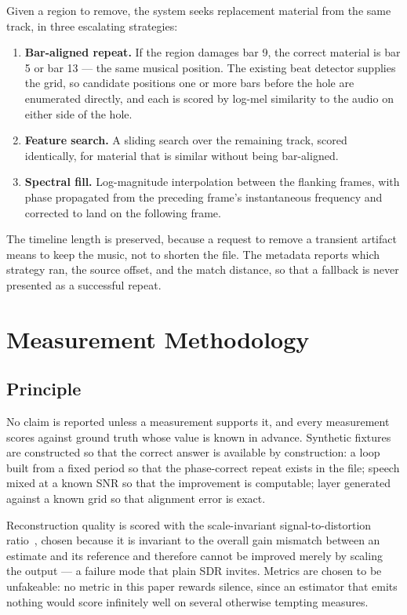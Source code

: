 \documentclass[conference]{IEEEtran}
\begin{document}
Given a region to remove, the system seeks replacement material from the same
track, in three escalating strategies:

\begin{enumerate}
\item \textbf{Bar-aligned repeat.} If the region damages bar 9, the correct
      material is bar 5 or bar 13 --- the same musical position. The existing
      beat detector supplies the grid, so candidate positions one or more bars
      before the hole are enumerated directly, and each is scored by log-mel
      similarity to the audio on either side of the hole.
\item \textbf{Feature search.} A sliding search over the remaining track,
      scored identically, for material that is similar without being
      bar-aligned.
\item \textbf{Spectral fill.} Log-magnitude interpolation between the flanking
      frames, with phase propagated from the preceding frame's instantaneous
      frequency and corrected to land on the following frame.
\end{enumerate}

The timeline length is preserved, because a request to remove a transient
artifact means to keep the music, not to shorten the file. The metadata reports
which strategy ran, the source offset, and the match distance, so that a
fallback is never presented as a successful repeat.

\section{Measurement Methodology}

\subsection{Principle}

No claim is reported unless a measurement supports it, and every measurement
scores against ground truth whose value is known in advance. Synthetic
fixtures are constructed so that the correct answer is available by
construction: a loop built from a fixed period so that the phase-correct repeat
exists in the file; speech mixed at a known SNR so that the improvement is
computable; layer generated against a known grid so that alignment error is
exact.

Reconstruction quality is scored with the scale-invariant signal-to-distortion
ratio~\cite{leroux2019sdr}, chosen because it is invariant to the overall gain
mismatch between an estimate and its reference and therefore cannot be improved
merely by scaling the output --- a failure mode that plain SDR invites. Metrics
are chosen to be unfakeable: no metric in this paper rewards silence, since an
estimator that emits nothing would score infinitely well on several otherwise
tempting measures.
\end{document}
